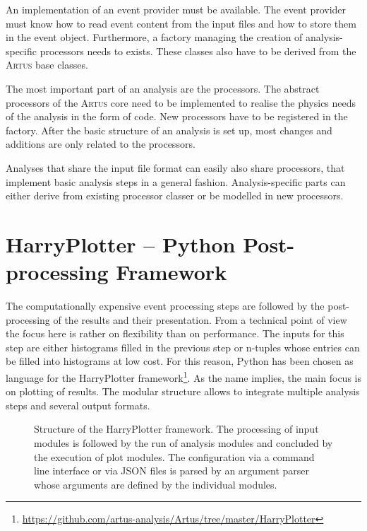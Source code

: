 \documentclass[3p]{elsarticle}
\newcommand{\software}[1]{\textsc{#1}\xspace}
\newcommand{\artus}{\software{Artus}}
\begin{document}
An implementation of an event provider must be available.
The event provider must know how to read event content from the input files and how to store them in the event object.
Furthermore, a factory managing the creation of analysis-specific processors needs to exists.
These classes also have to be derived from the \artus base classes.

The most important part of an analysis are the processors.
The abstract processors of the \artus core need to be implemented to realise the physics needs of the analysis in the form of code.
New processors have to be registered in the factory.
After the basic structure of an analysis is set up, most changes and additions are only related to the processors.

Analyses that share the input file format can easily also share processors, that implement basic analysis steps in a general fashion.
Analysis-specific parts can either derive from existing processor classer or be modelled in new processors.


\section{HarryPlotter -- Python Post-processing Framework \label{section_artus_harryplotter}}

The computationally expensive event processing steps are followed by the post-processing of the results and their presentation.
From a technical point of view the focus here is rather on flexibility than on performance.
The inputs for this step are either histograms filled in the previous step or n-tuples whose entries can be filled into histograms at low cost.
For this reason, Python has been chosen as language for the HarryPlotter framework\footnote{\url{https://github.com/artus-analysis/Artus/tree/master/HarryPlotter}}.
As the name implies, the main focus is on plotting of results.
The modular structure allows to integrate multiple analysis steps and several output formats.

\begin{figure}[htb]
\centering 
\caption{Structure of the HarryPlotter framework.
The processing of input modules is followed by the run of analysis modules and concluded by the execution of plot modules.
The configuration via a command line interface or via JSON files is parsed by an argument parser whose arguments are defined by the individual modules.}
\label{figure_artus_harry_plotter}
\end{figure}
\end{document}
